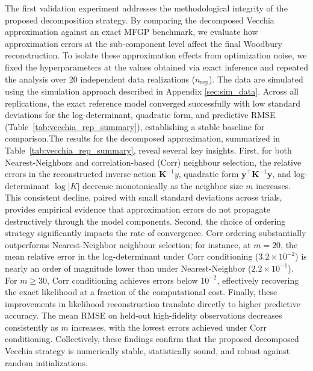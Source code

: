 \documentclass[12pt]{article}
\begin{document}
The first validation experiment addresses the methodological integrity of the proposed decomposition strategy. By comparing the decomposed Vecchia approximation against an exact MFGP benchmark, we evaluate how approximation errors at the sub-component level affect the final Woodbury reconstruction. To isolate these approximation effects from optimization noise, we fixed the hyperparameters at the values obtained via exact inference and repeated the analysis over 20 independent data realizations ($n_\text{rep}$). The data are simulated using the simulation approach described in Appendix \ref{sec:sim_data}.
Across all replications, the exact reference model converged successfully with low standard deviations for the log-determinant, quadratic form, and predictive RMSE (Table~\ref{tab:vecchia_rep_summary}), establishing a stable baseline for comparison.The results for the decomposed approximation, summarized in Table~\ref{tab:vecchia_rep_summary}, reveal several key insights. First, for both Nearest-Neighbors and correlation-based (Corr) neighbour selection, the relative errors in the reconstructed inverse action $\bm{K}^{-1}y$, quadratic form $\bm{y}^\top \bm{K}^{-1}\bm{y}$, and log-determinant $\log|K|$ decrease monotonically as the neighbor size $m$ increases. This consistent decline, paired with small standard deviations across trials, provides empirical evidence that approximation errors do not propagate destructively through the model components. Second, the choice of ordering strategy significantly impacts the rate of convergence. Corr ordering substantially outperforms Nearest-Neighbor neighbour selection; for instance, at $m=20$, the mean relative error in the log-determinant under Corr conditioning ($3.2 \times 10^{-2}$) is nearly an order of magnitude lower than under Nearest-Neighbor ($2.2 \times 10^{-1}$). For $m \geq 30$, Corr conditioning achieves errors below $10^{-2}$, effectively recovering the exact likelihood at a fraction of the computational cost. Finally, these improvements in likelihood reconstruction translate directly to higher predictive accuracy. The mean RMSE on held-out high-fidelity observations decreases consistently as $m$ increases, with the lowest errors achieved under Corr conditioning. Collectively, these findings confirm that the proposed decomposed Vecchia strategy is numerically stable, statistically sound, and robust against random initializations.
\end{document}

